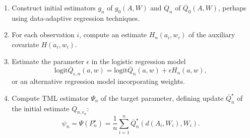 \documentclass[
  12pt, krantz2,
]{krantz}
\providecommand{\tightlist}{%
  \setlength{\itemsep}{0pt}\setlength{\parskip}{0pt}}
\theoremstyle{definition}
\theoremstyle{definition}
\theoremstyle{definition}
\newcommand{\1}{\mathbbm{1}}
\begin{document}
\begin{enumerate}
\def\labelenumi{\arabic{enumi}.}
\tightlist
\item
  Construct initial estimators \(g_n\) of \(g_0(A, W)\) and \(Q_n\) of
  \(\overline{Q}_0(A, W)\), perhaps using data-adaptive regression techniques.
\item
  For each observation \(i\), compute an estimate \(H_n(a_i, w_i)\) of the
  auxiliary covariate \(H(a_i,w_i)\).
\item
  Estimate the parameter \(\epsilon\) in the logistic regression model
  \[ \text{logit}\overline{Q}_{\epsilon, n}(a, w) =
  \text{logit}\overline{Q}_n(a, w) + \epsilon H_n(a, w),\]
  or an alternative regression model incorporating weights.
\item
  Compute TML estimator \(\Psi_n\) of the target parameter, defining update
  \(\overline{Q}_n^{\star}\) of the initial estimate
  \(\overline{Q}_{n, \epsilon_n}\):
  \begin{equation}
    \psi_n = \Psi(P_n^{\star}) = \frac{1}{n} \sum_{i = 1}^n
    \overline{Q}_n^{\star}(d(A_i, W_i), W_i).
    \label{eq:tmle}
  \end{equation}
\end{enumerate}
\end{document}
